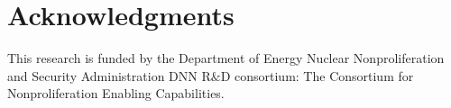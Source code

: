 \documentclass[fleqn]{anstrans}
\begin{document}
\section{Acknowledgments}

This research is funded by the Department of Energy Nuclear Nonproliferation and Security Administration DNN R$\&$D consortium: The Consortium for Nonproliferation Enabling Capabilities. 



\end{document}
